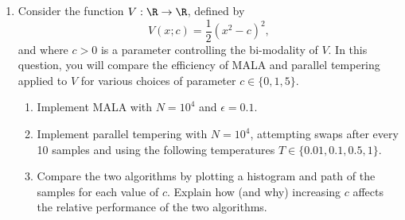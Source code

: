 \begin{enumerate}
\item[7.4] Consider the function $V : \R \to \R$, defined by
\[
  V(x; c) = \frac{1}{2}(x^2 - c)^2,
\]
and where $c > 0$ is a parameter controlling the bi-modality of $V$. In this question, you will
compare the efficiency of MALA and parallel tempering applied to $V$ for various choices of
parameter $c \in \{0, 1, 5\}$.
\begin{enumerate}
  \item Implement MALA with $N = 10^4$ and $\epsilon = 0.1$.
  \item Implement parallel tempering with $N = 10^4$, attempting swaps after every 10 samples
    and using the following temperatures $T \in \{0.01, 0.1, 0.5, 1\}$.
  \item Compare the two algorithms by plotting a histogram and path of the samples for each
    value of $c$. Explain how (and why) increasing $c$ affects the relative performance of the
    two algorithms.
\end{enumerate}

\end{enumerate}
